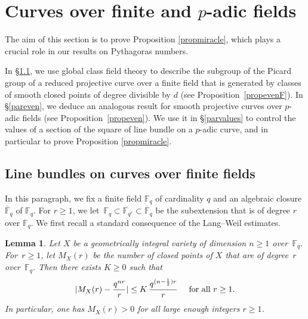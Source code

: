 \documentclass{amsart}
\newtheorem{lem}[thm]{Lemma}
\theoremstyle{definition}
\theoremstyle{remark}
\numberwithin{equation}{section}
\def\F{\mathbb F}
\def\oF{\overline{\mathbb{F}}}
\begin{document}
\section{Curves over finite and \texorpdfstring{$p$}{p}-adic fields}
\label{secmodel}

 The aim of this section is to prove Proposition \ref{propmiracle}, which plays a crucial role in our results on Pythagoras numbers. 
 
In \S\ref{parCFT}, we use global class field theory to describe the subgroup of the Picard group of a reduced projective curve over a finite field that is generated by classes of smooth closed points of degree divisible by $d$ (see Proposition~\ref{propevenF}). In \S\ref{pareven}, we deduce an analogous result for smooth projective curves over $p$-adic fields (see Proposition~\ref{propeven}). We use it in \S\ref{parvalues} to control the values of a section of the square of line bundle on a $p$-adic curve, and in particular to prove Proposition \ref{propmiracle}.
 

\subsection{Line bundles on curves over finite fields}
\label{parCFT}

In this paragraph, we fix a finite field $\F_q$ of cardinality $q$ and an algebraic closure $\oF_q$ of $\F_q$. For $r\geq 1$, we let~${\F_q\subset \F_{q^r}\subset\oF_q}$ be the subextension that is of degree $r$ over $\F_q$.
We first recall a standard consequence of the Lang--Weil estimates.

\begin{lem}
\label{lemLW}
Let $X$ be a geometrically integral variety of dimension $n\geq 1$ over~$\F_q$. For~$r\geq 1$, let $M_X(r)$ be the number of closed points of $X$ that are of degree~$r$ over~$\F_q$. Then there exists $K\geq 0$ such that
\begin{equation}
\label{LWclosed}
|M_X(r)-\frac{q^{nr}}{r}|\leq K\,\frac{q^{(n-\frac{1}{2})r}}{r}\textrm{\hspace{1em} for all }r\geq 1.
\end{equation}
In particular, one has $M_X(r)>0$ for all large enough integers $r\geq 1$.
\end{lem}
\end{document}
